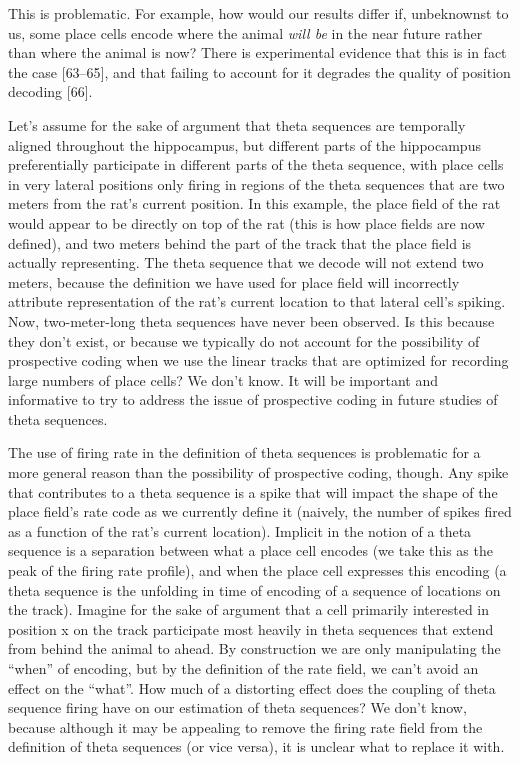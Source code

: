 \documentclass[]{article}
\begin{document}
This is problematic. For example, how would our results differ if,
unbeknownst to us, some place cells encode where the animal \emph{will
be} in the near future rather than where the animal is now? There is
experimental evidence that this is in fact the case {[}63--65{]}, and
that failing to account for it degrades the quality of position decoding
{[}66{]}.

Let's assume for the sake of argument that theta sequences are
temporally aligned throughout the hippocampus, but different parts of
the hippocampus preferentially participate in different parts of the
theta sequence, with place cells in very lateral positions only firing
in regions of the theta sequences that are two meters from the rat's
current position. In this example, the place field of the rat would
appear to be directly on top of the rat (this is how place fields are
now defined), and two meters behind the part of the track that the place
field is actually representing. The theta sequence that we decode will
not extend two meters, because the definition we have used for place
field will incorrectly attribute representation of the rat's current
location to that lateral cell's spiking. Now, two-meter-long theta
sequences have never been observed. Is this because they don't exist, or
because we typically do not account for the possibility of prospective
coding when we use the linear tracks that are optimized for recording
large numbers of place cells? We don't know. It will be important and
informative to try to address the issue of prospective coding in future
studies of theta sequences.

The use of firing rate in the definition of theta sequences is
problematic for a more general reason than the possibility of
prospective coding, though. Any spike that contributes to a theta
sequence is a spike that will impact the shape of the place field's rate
code as we currently define it (naively, the number of spikes fired as a
function of the rat's current location). Implicit in the notion of a
theta sequence is a separation between what a place cell encodes (we
take this as the peak of the firing rate profile), and when the place
cell expresses this encoding (a theta sequence is the unfolding in time
of encoding of a sequence of locations on the track). Imagine for the
sake of argument that a cell primarily interested in position x on the
track participate most heavily in theta sequences that extend from
behind the animal to ahead. By construction we are only manipulating the
``when'' of encoding, but by the definition of the rate field, we can't
avoid an effect on the ``what''. How much of a distorting effect does
the coupling of theta sequence firing have on our estimation of theta
sequences? We don't know, because although it may be appealing to remove
the firing rate field from the definition of theta sequences (or vice
versa), it is unclear what to replace it with.
\end{document}
